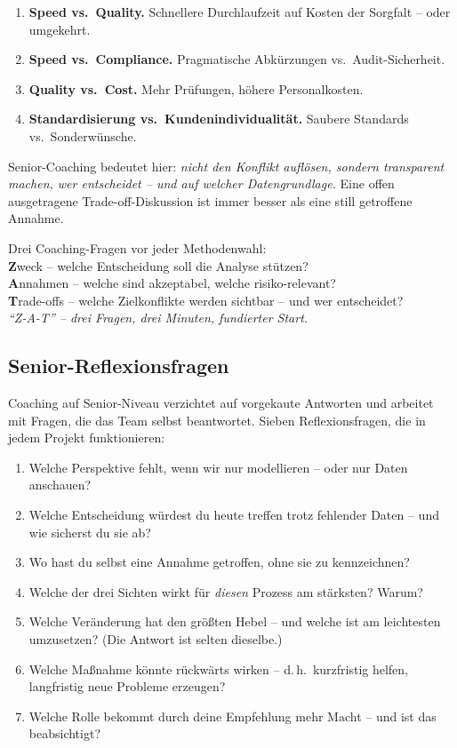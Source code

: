 \documentclass[11pt,a4paper,oneside]{article}
\newcommand{\caveatfontfallback}{\itshape}
\newcommand\caveatfont{\caveatfontfallback}%
\newcommand{\akzent}[1]{{\caveatfont\color{lpAmber}#1}}
\begin{document}
\begin{enumerate}
  \item \textbf{Speed vs.\ Quality.} Schnellere Durchlaufzeit auf Kosten der Sorgfalt -- oder umgekehrt.
  \item \textbf{Speed vs.\ Compliance.} Pragmatische Abkürzungen vs.\ Audit-Sicherheit.
  \item \textbf{Quality vs.\ Cost.} Mehr Prüfungen, höhere Personalkosten.
  \item \textbf{Standardisierung vs.\ Kundenindividualität.} Saubere Standards vs.\ Sonderwünsche.
\end{enumerate}

Senior-Coaching bedeutet hier: \emph{nicht den Konflikt auflösen, sondern transparent machen, wer entscheidet -- und auf welcher Datengrundlage.} Eine offen ausgetragene Trade-off-Diskussion ist immer besser als eine still getroffene Annahme.

\begin{eselsbox}[Eselsbrücke: \akzent{Z-A-T}]
Drei Coaching-Fragen vor jeder Methodenwahl:\\[2pt]
\textbf{Z}weck -- welche Entscheidung soll die Analyse stützen?\\
\textbf{A}nnahmen -- welche sind akzeptabel, welche risiko-relevant?\\
\textbf{T}rade-offs -- welche Zielkonflikte werden sichtbar -- und wer entscheidet?\\[2pt]
\emph{``Z-A-T'' -- drei Fragen, drei Minuten, fundierter Start.}
\end{eselsbox}

\subsection{Senior-Reflexionsfragen}

Coaching auf Senior-Niveau verzichtet auf vorgekaute Antworten und arbeitet mit Fragen, die das Team selbst beantwortet. Sieben Reflexionsfragen, die in jedem Projekt funktionieren:

\begin{enumerate}
  \item Welche Perspektive fehlt, wenn wir nur modellieren -- oder nur Daten anschauen?
  \item Welche Entscheidung würdest du heute treffen trotz fehlender Daten -- und wie sicherst du sie ab?
  \item Wo hast du selbst eine Annahme getroffen, ohne sie zu kennzeichnen?
  \item Welche der drei Sichten wirkt für \emph{diesen} Prozess am stärksten? Warum?
  \item Welche Veränderung hat den größten Hebel -- und welche ist am leichtesten umzusetzen? (Die Antwort ist selten dieselbe.)
  \item Welche Maßnahme könnte rückwärts wirken -- d.\,h.\ kurzfristig helfen, langfristig neue Probleme erzeugen?
  \item Welche Rolle bekommt durch deine Empfehlung mehr Macht -- und ist das beabsichtigt?
\end{enumerate}
\end{document}
